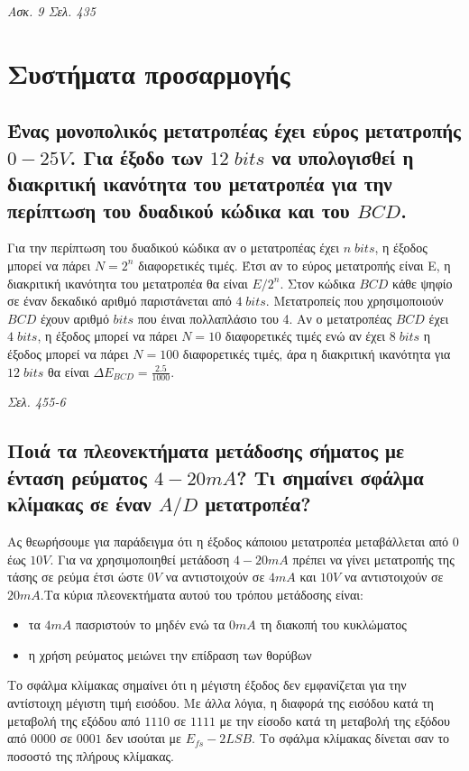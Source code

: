 \documentclass{article}
\begin{document}
\emph{Ασκ. 9 Σελ. 435}

\section{Συστήματα προσαρμογής}
\subsection{Ένας μονοπολικός μετατροπέας έχει εύρος μετατροπής $0-25V$. Για έξοδο των $12\; bits$ να υπολογισθεί η διακριτική ικανότητα του μετατροπέα για την περίπτωση 
του δυαδικού κώδικα και του $BCD$.}
Για την περίπτωση του δυαδικού κώδικα αν ο μετατροπέας έχει $n\; bits$, η έξοδος μπορεί να πάρει $Ν=2^n$ διαφορετικές τιμές. Έτσι αν το εύρος μετατροπής είναι Ε, η διακριτική
ικανότητα του μετατροπέα θα είναι $E/2^n$. Στον κώδικα $BCD$ κάθε ψηφίο σε έναν δεκαδικό αριθμό παριστάνεται από $4\; bits$. Μετατροπείς που χρησιμοποιούν $BCD$ 
έχουν αριθμό $bits$ που έιναι πολλαπλάσιο του 4. Αν ο μετατροπέας $BCD$ έχει $4\; bits$, η έξοδος μπορεί να πάρει $N=10$ διαφορετικές τιμές ενώ αν έχει $8\; bits$ η
έξοδος μπορεί να πάρει $Ν=100$ διαφορετικές τιμές, άρα η διακριτική ικανότητα για $12\; bits$ θα είναι $\Delta E_{BCD}=\frac{2.5}{1000}$.

\emph{Σελ. 455-6}

\subsection{Ποιά τα πλεονεκτήματα μετάδοσης σήματος με ένταση ρεύματος $4-20mA$? Τι σημαίνει σφάλμα κλίμακας σε έναν $A/D$ μετατροπέα?}
Ας θεωρήσουμε για παράδειγμα ότι η έξοδος κάποιου μετατροπέα μεταβάλλεται από $0$ έως $10V$. Για να χρησιμοποιηθεί μετάδοση $4-20 mA$ πρέπει να γίνει μετατροπής της 
τάσης σε ρεύμα έτσι ώστε $0V$ να αντιστοιχούν σε $4 mA$ και $10V$ να αντιστοιχούν σε $20 mA$.Τα κύρια πλεονεκτήματα αυτού του τρόπου μετάδοσης είναι:

\begin{itemize}
    \item τα $4mA$ πασριστούν το μηδέν ενώ τα $0mA$ τη διακοπή του κυκλώματος
    \item η χρήση ρεύματος μειώνει την επίδραση των θορύβων
\end{itemize}

Το σφάλμα κλίμακας σημαίνει ότι η μέγιστη έξοδος δεν εμφανίζεται για την αντίστοιχη μέγιστη τιμή εισόδου. Με άλλα λόγια, η διαφορά της εισόδου κατά τη μεταβολή της 
εξόδου από $1110$ σε $1111$ με την είσοδο κατά τη μεταβολή της εξόδου από $0000$ σε $0001$ δεν ισούται με $E_{fs}-2LSB$. Το σφάλμα κλίμακας δίνεται σαν το ποσοστό 
της πλήρους κλίμακας.
\end{document}

